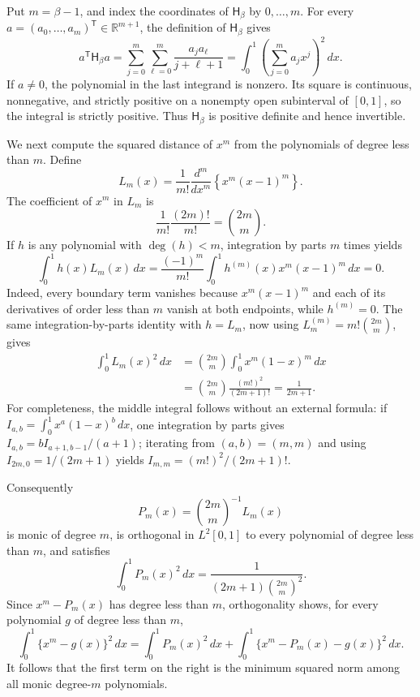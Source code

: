 Put \(m=\beta-1\), and index the coordinates of \(\mathsf H_\beta\) by \(0,\ldots,m\).  For every \(a=(a_0,\ldots,a_m)^{\mathsf T}\in\mathbb R^{m+1}\), the definition of \(\mathsf H_\beta\) gives
\[
a^{\mathsf T}\mathsf H_\beta a
=\sum_{j=0}^m\sum_{\ell=0}^m\frac{a_ja_\ell}{j+\ell+1}
=\int_0^1\left(\sum_{j=0}^m a_jx^j\right)^2\,dx.
\]
If \(a\ne0\), the polynomial in the last integrand is nonzero.  Its square is continuous, nonnegative, and strictly positive on a nonempty open subinterval of \([0,1]\), so the integral is strictly positive.  Thus \(\mathsf H_\beta\) is positive definite and hence invertible.

We next compute the squared distance of \(x^m\) from the polynomials of degree less than \(m\).  Define
\[
L_m(x)=\frac{1}{m!}\frac{d^m}{dx^m}\left\{x^m(x-1)^m\right\}.
\]
The coefficient of \(x^m\) in \(L_m\) is
\[
\frac{1}{m!}\frac{(2m)!}{m!}=\binom{2m}{m}.
\]
If \(h\) is any polynomial with \(\deg(h)<m\), integration by parts \(m\) times yields
\[
\int_0^1h(x)L_m(x)\,dx
=\frac{(-1)^m}{m!}\int_0^1h^{(m)}(x)x^m(x-1)^m\,dx
=0.
\]
Indeed, every boundary term vanishes because \(x^m(x-1)^m\) and each of its derivatives of order less than \(m\) vanish at both endpoints, while \(h^{(m)}=0\).  The same integration-by-parts identity with \(h=L_m\), now using \(L_m^{(m)}=m!\binom{2m}{m}\), gives
\[
\begin{aligned}
\int_0^1L_m(x)^2\,dx
&=\binom{2m}{m}\int_0^1x^m(1-x)^m\,dx\\
&=\binom{2m}{m}\frac{(m!)^2}{(2m+1)!}
=\frac{1}{2m+1}.
\end{aligned}
\]
For completeness, the middle integral follows without an external formula: if \(I_{a,b}=\int_0^1x^a(1-x)^b\,dx\), one integration by parts gives \(I_{a,b}=bI_{a+1,b-1}/(a+1)\); iterating from \((a,b)=(m,m)\) and using \(I_{2m,0}=1/(2m+1)\) yields \(I_{m,m}=(m!)^2/(2m+1)!\).

Consequently
\[
P_m(x)=\binom{2m}{m}^{-1}L_m(x)
\]
is monic of degree \(m\), is orthogonal in \(L^2[0,1]\) to every polynomial of degree less than \(m\), and satisfies
\[
\int_0^1P_m(x)^2\,dx
=\frac{1}{(2m+1)\binom{2m}{m}^{2}}.
\]
Since \(x^m-P_m(x)\) has degree less than \(m\), orthogonality shows, for every polynomial \(g\) of degree less than \(m\),
\[
\int_0^1\{x^m-g(x)\}^2\,dx
=\int_0^1P_m(x)^2\,dx
+\int_0^1\{x^m-P_m(x)-g(x)\}^2\,dx.
\]
It follows that the first term on the right is the minimum squared norm among all monic degree-\(m\) polynomials.

